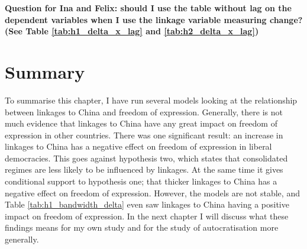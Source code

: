 \textbf{Question for Ina and Felix: should I use the table without lag on the dependent variables when I use the linkage variable measuring change? (See Table \ref{tab:h1_delta_x_lag} and \ref{tab:h2_delta_x_lag})}

\section{Summary}
To summarise this chapter, I have run several models looking at the relationship between linkages to China and freedom of expression. Generally, there is not much evidence that linkages to China have any great impact on freedom of expression in other countries. There was one significant result: an increase in linkages to China has a negative effect on freedom of expression in liberal democracies. This goes against hypothesis two, which states that consolidated regimes are less likely to be influenced by linkages. At the same time it gives conditional support to hypothesis one; that thicker linkages to China has a negative effect on freedom of expression. However, the models are not stable, and Table \ref{tab:h1_bandwidth_delta} even saw linkages to China having a positive impact on freedom of expression. In the next chapter I will discuss what these findings means for my own study and for the study of autocratisation more generally.